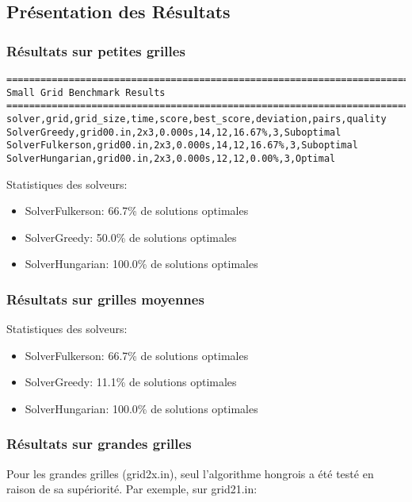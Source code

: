 \documentclass[11pt, a4paper]{article}
\begin{document}
\subsection{Présentation des Résultats}

\subsubsection{Résultats sur petites grilles}

\begin{lstlisting}[caption=Extrait des resultats sur petites grilles]
================================================================================
Small Grid Benchmark Results
================================================================================
solver,grid,grid_size,time,score,best_score,deviation,pairs,quality
SolverGreedy,grid00.in,2x3,0.000s,14,12,16.67%,3,Suboptimal
SolverFulkerson,grid00.in,2x3,0.000s,14,12,16.67%,3,Suboptimal
SolverHungarian,grid00.in,2x3,0.000s,12,12,0.00%,3,Optimal
\end{lstlisting}

Statistiques des solveurs:
\begin{itemize}
    \item SolverFulkerson: 66.7\% de solutions optimales
    \item SolverGreedy: 50.0\% de solutions optimales
    \item SolverHungarian: 100.0\% de solutions optimales
\end{itemize}

\subsubsection{Résultats sur grilles moyennes}

Statistiques des solveurs:
\begin{itemize}
    \item SolverFulkerson: 66.7\% de solutions optimales
    \item SolverGreedy: 11.1\% de solutions optimales
    \item SolverHungarian: 100.0\% de solutions optimales
\end{itemize}

\subsubsection{Résultats sur grandes grilles}

Pour les grandes grilles (grid2x.in), seul l'algorithme hongrois a été testé en raison de sa supériorité. Par exemple, sur grid21.in:
\end{document}
